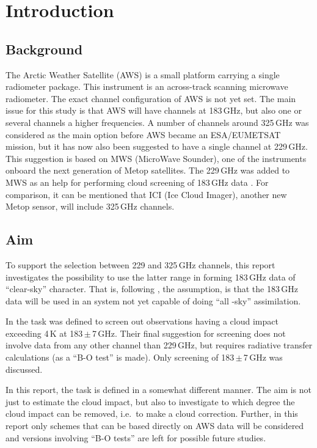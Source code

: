 \documentclass[12pt]{article}
\begin{document}
\section{Introduction}
%
\subsection{Background}
The Arctic Weather Satellite (AWS) is a small platform carrying a single
radiometer package. This instrument is an across-track scanning microwave
radiometer. The exact channel configuration of AWS is not yet set. The main
issue for this study is that AWS will have channels at 183\,GHz, but also one
or several channels a higher frequencies. A number of channels around 325\,GHz
was considered as the main option before AWS became an ESA/EUMETSAT mission,
but it has now also been suggested to have a single channel at 229\,GHz. This
suggestion is based on MWS (MicroWave Sounder), one of the instruments onboard
the next generation of Metop satellites. The 229\,GHz was added to MWS as an
help for performing cloud screening of 183\,GHz data
\citep{rekha2012potential}. For comparison, it can be mentioned that ICI (Ice
Cloud Imager), another new Metop sensor, will include 325\,GHz channels.

\subsection{Aim}
%
To support the selection between 229 and 325\,GHz channels, this report
investigates the possibility to use the latter range in forming 183\,GHz data of
``clear-sky'' character. That is, following \citet{rekha2012potential}, the
assumption, is that the 183\,GHz data will be used in an system not yet
capable of doing ``all -sky'' assimilation.

In \citet{rekha2012potential} the task was defined to screen out observations
having a cloud impact exceeding 4\,K at 183\,$\pm$\,7\,GHz. Their final suggestion
for screening does not involve data from any other channel than 229\,GHz, but
requires radiative transfer calculations (as a ``B-O test'' is made). Only 
screening of 183\,$\pm$\,7\,GHz was discussed.

In this report, the task is defined in a somewhat different manner. The aim is
not just to estimate the cloud impact, but also to investigate to which degree
the cloud impact can be removed, i.e.\ to make a cloud correction. Further, in
this report only schemes that can be based directly on AWS data will be
considered and versions involving ``B-O tests'' are left for possible future
studies.
\end{document}

